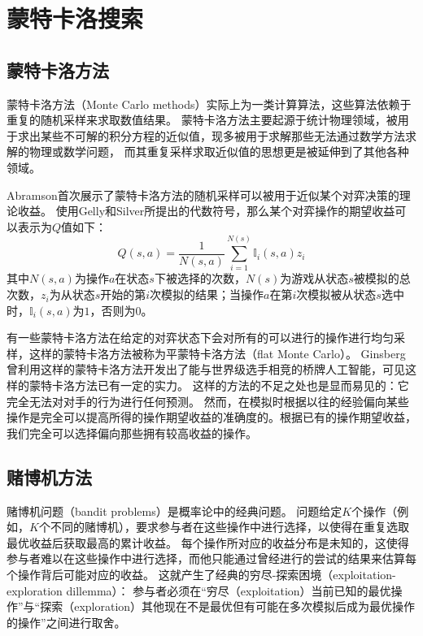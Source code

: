 \section{蒙特卡洛搜索}
\label{section:MonteCarloSearch}
\subsection{蒙特卡洛方法}
\label{section:MonteCarloMethods}

蒙特卡洛方法（Monte Carlo methods）实际上为一类计算算法，这些算法依赖于重复的随机采样来求取数值结果。
蒙特卡洛方法主要起源于统计物理领域，被用于求出某些不可解的积分方程的近似值，现多被用于求解那些无法通过数学方法求解的物理或数学问题，
而其重复采样求取近似值的思想更是被延伸到了其他各种领域。

Abramson\cite{abramson1990expected}首次展示了蒙特卡洛方法的随机采样可以被用于近似某个对弈决策的理论收益。
使用Gelly和Silver所提出的代数符号\cite{gelly2011monte}，那么某个对弈操作的期望收益可以表示为$Q$值如下：
\begin{equation}
Q(s,a) = \frac{1}{N(s,a)} \sum_{i=1}^{N(s)}\mathbb{I}_i (s,a)z_i
\end{equation}
其中$N(s,a)$为操作$a$在状态$s$下被选择的次数，$N(s)$为游戏从状态$s$被模拟的总次数，$z_i$为从状态$s$开始的第$i$次模拟的结果；当操作$a$在第$i$次模拟被从状态$s$选中时，$\mathbb{I}_i (s,a)$为$1$，否则为$0$。

有一些蒙特卡洛方法在给定的对弈状态下会对所有的可以进行的操作进行均匀采样，这样的蒙特卡洛方法被称为平蒙特卡洛方法（flat Monte Carlo）。
Ginsberg曾利用这样的蒙特卡洛方法开发出了能与世界级选手相竞的桥牌人工智能\cite{ginsberg2001gib}，可见这样的蒙特卡洛方法已有一定的实力。
这样的方法的不足之处也是显而易见的：它完全无法对对手的行为进行任何预测\cite{browne2011dangers}。
然而，在模拟时根据以往的经验偏向某些操作是完全可以提高所得的操作期望收益的准确度的。根据已有的操作期望收益，我们完全可以选择偏向那些拥有较高收益的操作。

\subsection{赌博机方法}
\label{section:BanditBasedMethods}

赌博机问题（bandit problems）是概率论中的经典问题。
问题给定$K$个操作（例如，$K$个不同的赌博机），要求参与者在这些操作中进行选择，以使得在重复选取最优收益后获取最高的累计收益。
每个操作所对应的收益分布是未知的，这使得参与者难以在这些操作中进行选择，而他只能通过曾经进行的尝试的结果来估算每个操作背后可能对应的收益。
这就产生了经典的穷尽-探索困境（exploitation-exploration dillemma）：
参与者必须在“穷尽（exploitation）当前已知的最优操作”与“探索（exploration）其他现在不是最优但有可能在多次模拟后成为最优操作的操作”之间进行取舍。

